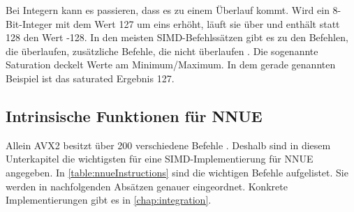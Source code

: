 Bei Integern kann es passieren, dass es zu einem Überlauf kommt. Wird ein 8-Bit-Integer mit dem Wert 127 um eins erhöht, läuft sie über und enthält statt 128 den Wert -128. In den meisten \ac{SIMD}-Befehlssätzen gibt es zu den Befehlen, die überlaufen, zusätzliche Befehle, die nicht überlaufen \cite{intelIntrinsics}. Die sogenannte Saturation deckelt Werte am Minimum/Maximum. In dem gerade genannten Beispiel ist das saturated Ergebnis 127.

\subsection{Intrinsische Funktionen für NNUE}
\label{chap:intrinsicsForNNUE}

Allein \ac{AVX2} besitzt über 200 verschiedene Befehle \cite{intelIntrinsics}. Deshalb sind in diesem Unterkapitel die wichtigsten für eine \ac{SIMD}-Implementierung für NNUE angegeben. In \autoref{table:nnueInstructions} sind die wichtigen Befehle aufgelistet. Sie werden in nachfolgenden Absätzen genauer eingeordnet. Konkrete Implementierungen gibt es in \autoref{chap:integration}.

